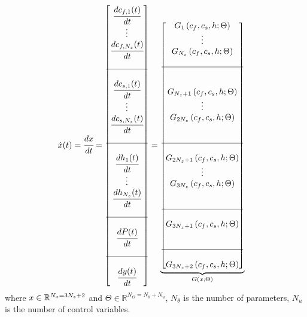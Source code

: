 \documentclass[../Article_Model_Parameters.tex]{subfiles}
\begin{document}
				{\footnotesize
					\begin{align*} \label{discretization}
						\dot{x}(t) &= \cfrac{d x}{d t} = 
						\begin{bmatrix}
							\cfrac{d c_{f,1}(t)}{d t} 	  \\
							\vdots					  \\
							\cfrac{d c_{f,N_z}(t)}{d t} \\
							\\ \hline \\
							\cfrac{d c_{s,1}(t)}{d t} 	  \\
							\vdots					  \\
							\cfrac{d c_{s,N_z}(t)}{d t} \\
							\\ \hline \\
							\cfrac{d h_1(t)}{d t} 	  \\
							\vdots 					  \\
							\cfrac{d h_{N_z}(t)}{d t} \\
							\\ \hline \\
							\cfrac{d P(t)}{d t} \\
							\\ \hline \\
							\cfrac{d y(t)}{d t}
						\end{bmatrix}
						=
						\underbrace{\begin{bmatrix}
								G_1 \left( c_f,c_s,h; \Theta \right)\\ 
								\vdots\\ 
								G_{N_z} \left( c_f,c_s,h; \Theta \right)\\ 
								\\ \hline \\ \\
								G_{N_z+1} \left( c_f,c_s,h; \Theta \right)\\ 
								\vdots\\
								G_{2N_z} \left( c_f,c_s,h; \Theta \right)\\ 
								\\ \\ \hline \\ 
								G_{2N_z+1} \left( c_f,c_s,h; \Theta \right) \\
								\vdots\\
								G_{3N_z} \left( c_f,c_s,h; \Theta \right) \\ 
								\\ \\ \hline \\
								G_{3N_z+1} \left( c_f,c_s,h; \Theta \right) \\
								\\ \\ \hline \\
								G_{3N_z+2} \left( c_f,c_s,h; \Theta \right) 
						\end{bmatrix}}_{G \left( x; \Theta \right)} 
				\end{align*} }
			where ${\color{black}x} \in \mathbb{R}^{N_x = 3N_z+2} $ and $\Theta \in \mathbb{R}^{N_\Theta =  N_{\theta} + N_u } $, $N_{\theta}$ is the number of parameters, $N_{u}$ is the number of control variables.
			
\end{document}

